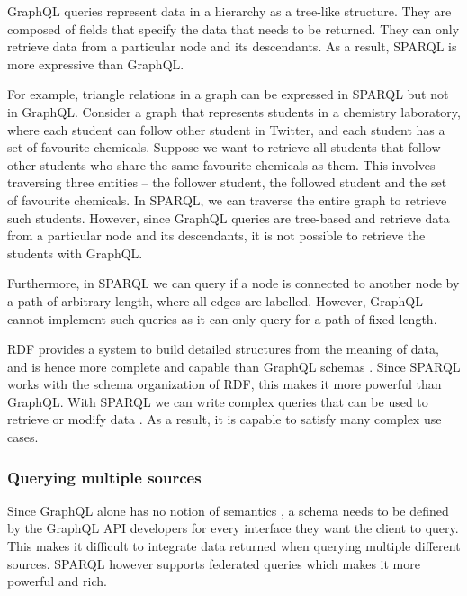 GraphQL queries represent data in a hierarchy as a tree-like structure. They are composed of fields that specify the data that needs to be returned. They can only retrieve data from a particular node and its descendants. As a result, SPARQL is more expressive than GraphQL.

For example, triangle relations in a graph can be expressed in SPARQL but not in GraphQL. Consider a graph that represents students in a chemistry laboratory, where each student can follow other student in Twitter, and each student has a set of favourite chemicals. Suppose we want to retrieve all students that follow other students who share the same favourite chemicals as them. This involves traversing three entities – the follower student, the followed student and the set of favourite chemicals. In SPARQL, we can traverse the entire graph to retrieve such students. However, since GraphQL queries are tree-based and retrieve data from a particular node and its descendants, it is not possible to retrieve the students with GraphQL. 

Furthermore, in SPARQL we can query if a node is connected to another node by a path of arbitrary length, where all edges are labelled. However, GraphQL cannot implement such queries as it can only query for a path of fixed length.

RDF provides a system to build detailed structures from the meaning of data, and is hence more complete and capable than GraphQL schemas \cite{Dresslar2019}. Since SPARQL works with the schema organization of RDF, this makes it more powerful than GraphQL. With SPARQL we can write complex queries that can be used to retrieve or modify data \cite{Angele2022}. As a result, it is capable to satisfy many complex use cases.

\subsubsection*{Querying multiple sources}
Since GraphQL alone has no notion of semantics \cite{Taelman2018}, a schema needs to be defined by the GraphQL API developers for every interface they want the client to query. This makes it difficult to integrate data returned when querying multiple different sources. SPARQL however supports federated queries which makes it more powerful and rich. 